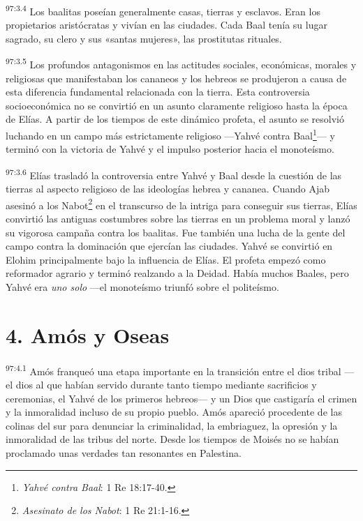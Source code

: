 \par
\textsuperscript{97:3.4} Los baalitas poseían generalmente casas, tierras y esclavos. Eran los propietarios aristócratas y vivían en las ciudades. Cada Baal tenía su lugar sagrado, su clero y sus «santas mujeres», las prostitutas rituales.

\par
\textsuperscript{97:3.5} Los profundos antagonismos en las actitudes sociales, económicas, morales y religiosas que manifestaban los cananeos y los hebreos se produjeron a causa de esta diferencia fundamental relacionada con la tierra. Esta controversia socioeconómica no se convirtió en un asunto claramente religioso hasta la época de Elías. A partir de los tiempos de este dinámico profeta, el asunto se resolvió luchando en un campo más estrictamente religioso ---Yahvé contra Baal\footnote{\textit{Yahvé contra Baal}: 1 Re 18:17-40.}--- y terminó con la victoria de Yahvé y el impulso posterior hacia el monoteísmo.

\par
\textsuperscript{97:3.6} Elías trasladó la controversia entre Yahvé y Baal desde la cuestión de las tierras al aspecto religioso de las ideologías hebrea y cananea. Cuando Ajab asesinó a los Nabot\footnote{\textit{Asesinato de los Nabot}: 1 Re 21:1-16.} en el transcurso de la intriga para conseguir sus tierras, Elías convirtió las antiguas costumbres sobre las tierras en un problema moral y lanzó su vigorosa campaña contra los baalitas. Fue también una lucha de la gente del campo contra la dominación que ejercían las ciudades. Yahvé se convirtió en Elohim principalmente bajo la influencia de Elías. El profeta empezó como reformador agrario y terminó realzando a la Deidad. Había muchos Baales, pero Yahvé era \textit{uno solo} ---el monoteísmo triunfó sobre el politeísmo.

\section*{4. Amós y Oseas}
\par
\textsuperscript{97:4.1} Amós franqueó una etapa importante en la transición entre el dios tribal ---el dios al que habían servido durante tanto tiempo mediante sacrificios y ceremonias, el Yahvé de los primeros hebreos--- y un Dios que castigaría el crimen y la inmoralidad incluso de su propio pueblo. Amós apareció procedente de las colinas del sur para denunciar la criminalidad, la embriaguez, la opresión y la inmoralidad de las tribus del norte. Desde los tiempos de Moisés no se habían proclamado unas verdades tan resonantes en Palestina.

